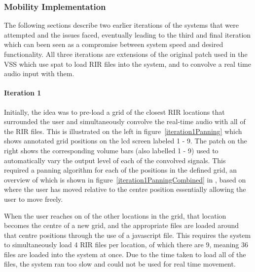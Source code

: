 \documentclass[../../main.tex]{subfiles}
\begin{document}
		\subsubsection{Mobility Implementation}

		The following sections describe two earlier iterations of the systems that were attempted and the issues faced, eventually leading to the third and final iteration which can been seen as a compromise between system speed and desired functionality. All three iterations are extensions of the original patch used in the \ac{VSS} which use spat to load \ac{RIR} files into the system, and to convolve a real time audio input with them.

		 \paragraph{Iteration 1}
		 \label{iteration1}

		 	Initially, the idea was to pre-load a grid of the closest \ac{RIR} locations that surrounded the user and simultaneously convolve the real-time audio with all of the \ac{RIR} files. This is illustrated on the left in figure~\ref{iteration1Panning} which shows annotated grid positions on the lcd screen labeled 1 - 9. The patch on the right shows the corresponding volume bars (also labelled 1 - 9) used to automatically vary the output level of each of the convolved signals. This required a panning algorithm for each of the positions in the defined grid, an overview of which is shown in figure~\ref{iteration1PanningCombined} in , based on where the user has moved relative to the centre position essentially allowing the user to move freely.

		 	When the user reaches on of the other locations in the grid, that location becomes the centre of a new grid, and the appropriate files are loaded around that centre positions through the use of a javascript file. This requires the system to simultaneously load 4 \ac{RIR} files per location, of which there are 9, meaning 36 files are loaded into the system at once. Due to the time taken to load all of the files, the system ran too slow and could not be used for real time movement.
\end{document}
